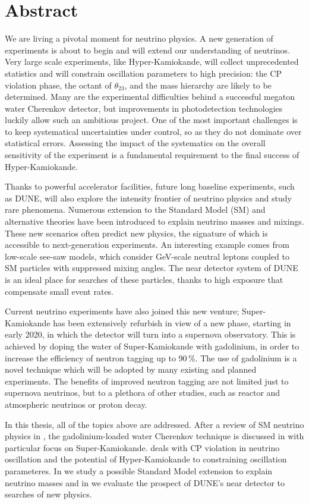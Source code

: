 \clearpage

\section*{Abstract}

We are living a pivotal moment for neutrino physics.
A new generation of experiments is about to begin and will extend our understanding of neutrinos. %
Very large scale experiments, like Hyper-Kamiokande, will collect unprecedented statistics and %
will constrain oscillation parameters to high precision: the CP violation phase, the octant of $\theta_{23}$, %
and the mass hierarchy are likely to be determined.
Many are the experimental difficulties behind a successful megaton water Cherenkov detector, %
but improvements in photodetection technologies luckily allow such an ambitious project.
One of the most important challenges is to keep systematical uncertainties under control, %
so as they do not dominate over statistical errors.
Assessing the impact of the systematics on the overall sensitivity of the experiment is a fundamental requirement %
to the final success of Hyper-Kamiokande.

Thanks to powerful accelerator facilities, future long baseline experiments, such as DUNE, will also explore %
the intensity frontier of neutrino physics and study rare phenomena.
Numerous extension to the Standard Model (SM) and alternative theories have been introduced to %
explain neutrino masses and mixings.
These new scenarios often predict new physics, the signature of which is accessible to next-generation experiments.
An interesting example comes from low-scale see-saw models, which consider GeV-scale neutral leptons %
coupled to SM particles with suppressed mixing angles.
The near detector system of DUNE is an ideal place for searches of these particles, %
thanks to high exposure that compensate small event rates.

Current neutrino experiments have also joined this new venture; %
Super-Kamiokande has been extensively refurbish in view of a new phase, starting in early 2020, %
in which the detector will turn into a supernova observatory.
This is achieved by doping the water of Super-Kamiokande with gadolinium, %
in order to increase the efficiency of neutron tagging up to 90\,\%.
The use of gadolinium is a novel technique which will be adopted by many existing and planned experiments.
The benefits of improved neutron tagging are not limited just to supernova neutrinos, but %
to a plethora of other studies, such as reactor and atmospheric neutrinos or proton decay.

In this thesis, all of the topics above are addressed.
After a review of SM neutrino physics in , the gadolinium-loaded water Cherenkov technique %
is discussed in  with particular focus on Super-Kamiokande.
 deals with CP violation in neutrino oscillation and the potential of Hyper-Kamiokande to %
constraining oscillation parameteres.
In  we study a possible Standard Model extension to explain neutrino masses %
and in  we evaluate the prospect of DUNE's near detector to searches of new physics.
